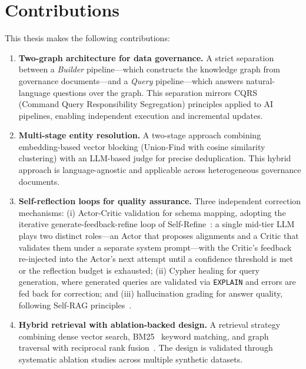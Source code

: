 \section{Contributions}
\label{sec:intro:contributions}

This thesis makes the following contributions:

\begin{enumerate}
    \item \textbf{Two-graph architecture for data governance.} A strict separation between a \emph{Builder} pipeline---which constructs the knowledge graph from governance documents---and a \emph{Query} pipeline---which answers natural-language questions over the graph. This separation mirrors CQRS~\cite{young2010cqrs} (Command Query Responsibility Segregation) principles applied to AI pipelines, enabling independent execution and incremental updates.

    \item \textbf{Multi-stage entity resolution.} A two-stage approach combining embedding-based vector blocking (Union-Find with cosine similarity clustering) with an LLM-based judge for precise deduplication. This hybrid approach is language-agnostic and applicable across heterogeneous governance documents.

    \item \textbf{Self-reflection loops for quality assurance.} Three independent correction mechanisms: (i) Actor-Critic validation for schema mapping, adopting the iterative generate-feedback-refine loop of Self-Refine~\cite{madaan2023selfrefineiterativerefinementselffeedback}: a single mid-tier LLM plays two distinct roles---an Actor that proposes alignments and a Critic that validates them under a separate system prompt---with the Critic's feedback re-injected into the Actor's next attempt until a confidence threshold is met or the reflection budget is exhausted; (ii) Cypher healing for query generation, where generated queries are validated via \texttt{EXPLAIN} and errors are fed back for correction; and (iii) hallucination grading for answer quality, following Self-RAG principles~\cite{asai2023selfraglearningretrievegenerate}.

    \item \textbf{Hybrid retrieval with ablation-backed design.} A retrieval strategy combining dense vector search, BM25~\cite{robertson2009probabilistic} keyword matching, and graph traversal with reciprocal rank fusion~\cite{cormack2009reciprocalrankfusionoutperforms}. The design is validated through systematic ablation studies across multiple synthetic datasets.


\end{enumerate}
